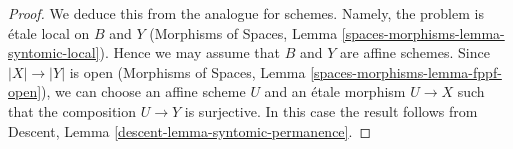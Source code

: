 \documentclass[10pt,a4paper]{amsart}
\theoremstyle{plain}
\theoremstyle{definition}
\theoremstyle{remark}
\numberwithin{equation}{subsection}
\begin{document}
\begin{proof}
We deduce this from the analogue for schemes.
Namely, the problem is \'etale local on $B$ and $Y$
(Morphisms of Spaces, Lemma
\ref{spaces-morphisms-lemma-syntomic-local}).
Hence we may assume that $B$ and $Y$ are affine
schemes. Since $|X| \to |Y|$ is open
(Morphisms of Spaces, Lemma \ref{spaces-morphisms-lemma-fppf-open}),
we can choose an affine
scheme $U$ and an \'etale morphism $U \to X$ such that the
composition $U \to Y$ is surjective. In this case the result
follows from Descent, Lemma
\ref{descent-lemma-syntomic-permanence}.
\end{proof}
\end{document}
